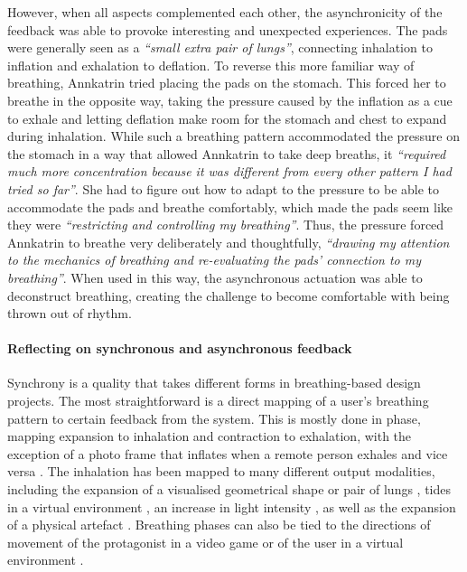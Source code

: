 However, when all aspects complemented each other, the asynchronicity of the feedback was able to provoke interesting and unexpected experiences. The pads were generally seen as a \textit{``small extra pair of lungs''}, connecting inhalation to inflation and exhalation to deflation. To reverse this more familiar way of breathing, Annkatrin tried placing the pads on the stomach. This forced her to breathe in the opposite way, taking the pressure caused by the inflation as a cue to exhale and letting deflation make room for the stomach and chest to expand during inhalation. While such a breathing pattern accommodated the pressure on the stomach in a way that allowed Annkatrin to take deep breaths, it \textit{``required much more concentration because it was different from every other pattern I had tried so far''}. She had to figure out how to adapt to the pressure to be able to accommodate the pads and breathe comfortably, which made the pads seem like they were \textit{``restricting and controlling my breathing''}. Thus, the pressure forced Annkatrin to breathe very deliberately and thoughtfully, \textit{``drawing my attention to the mechanics of breathing and re-evaluating the pads’ connection to my breathing''}. When used in this way, the asynchronous actuation was able to deconstruct breathing, creating the challenge to become comfortable with being thrown out of rhythm.


\paragraph{Reflecting on synchronous and asynchronous feedback}

Synchrony is a quality that takes different forms in breathing-based design projects. The most straightforward is a direct mapping of a user's breathing pattern to certain feedback from the system. This is mostly done in phase, mapping expansion to inhalation and contraction to exhalation, with the exception of a photo frame that inflates when a remote person exhales and vice versa \cite{kim_breathingframe_2015}. The inhalation has been mapped to many different output modalities, including the expansion of a visualised geometrical shape \cite{van_rooij_deep_2016, prpa_hacking_2016, wongsuphasawat_you_2012} or pair of lungs \cite{abushakra_augmenting_2014}, tides in a virtual environment \cite{roo_inner_2017}, an increase in light intensity \cite{dijk_breathe_2011, stahl_soma_2016}, as well as the expansion of a physical artefact \cite{aslan_hold_2016, kim_breathingframe_2015, sun_breath_2017, moran_exopranayama:_2016, sjoman_breathing_2018}. Breathing phases can also be tied to the directions of movement of the protagonist in a video game \cite{sonne_chillfish_2016} or of the user in a virtual environment \cite{van_rooij_deep_2016, davies_osmose_1996, prpa_hacking_2016}.

